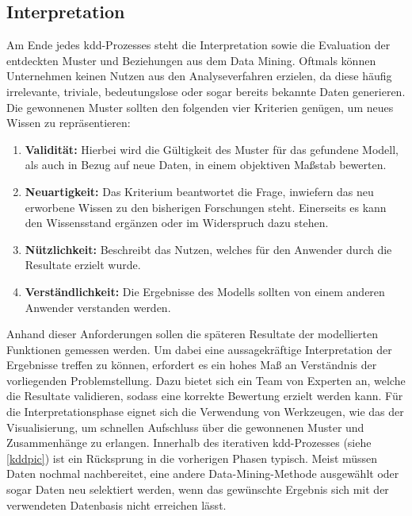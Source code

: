 \newpage
\subsection{Interpretation}
\label{int}
Am Ende jedes \gls{kdd}-Prozesses steht die Interpretation sowie die Evaluation der entdeckten Muster und Beziehungen aus dem Data Mining. Oftmals können Unternehmen keinen Nutzen aus den Analyseverfahren erzielen, da diese häufig irrelevante, triviale, bedeutungslose oder sogar bereits bekannte Daten generieren. Die gewonnenen Muster sollten den folgenden vier Kriterien genügen, um neues Wissen zu repräsentieren:

\begin{enumerate}
\item \textbf{Validität:} Hierbei wird die Gültigkeit des Muster für das gefundene Modell, als auch in Bezug auf neue Daten, in einem objektiven Maßstab bewerten.
\item \textbf{Neuartigkeit:} Das Kriterium beantwortet die Frage, inwiefern das neu erworbene Wissen zu den bisherigen Forschungen steht. Einerseits es kann den Wissensstand ergänzen oder im Widerspruch dazu stehen.
\item \textbf{Nützlichkeit:} Beschreibt das Nutzen, welches für den Anwender durch die Resultate erzielt wurde.
\item \textbf{Verständlichkeit:} Die Ergebnisse des Modells sollten von einem anderen Anwender verstanden werden.
\end{enumerate}

Anhand dieser Anforderungen sollen die späteren Resultate der modellierten Funktionen gemessen werden. Um dabei eine aussagekräftige Interpretation der Ergebnisse treffen zu können, erfordert es ein hohes Maß an Verständnis der vorliegenden Problemstellung. Dazu bietet sich ein Team von Experten an, welche die Resultate validieren, sodass eine korrekte Bewertung erzielt werden kann. Für die Interpretationsphase eignet sich die Verwendung von Werkzeugen, wie das der Visualisierung, um schnellen Aufschluss über die gewonnenen Muster und Zusammenhänge zu erlangen. Innerhalb des iterativen \gls{kdd}-Prozesses (siehe \vref{kddpic}) ist ein Rücksprung in die vorherigen Phasen typisch. Meist müssen Daten nochmal nachbereitet, eine andere Data-Mining-Methode ausgewählt oder sogar Daten neu selektiert werden, wenn das gewünschte Ergebnis sich mit der verwendeten Datenbasis nicht erreichen lässt.